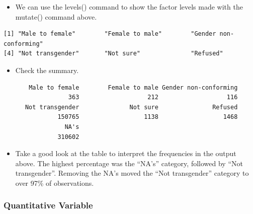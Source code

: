 \documentclass[
  letterpaper,
  DIV=11,
  numbers=noendperiod]{scrreprt}
\newenvironment{Shaded}{\begin{snugshade}}{\end{snugshade}}
\newcommand{\FunctionTok}[1]{\textcolor[rgb]{0.28,0.35,0.67}{#1}}
\newcommand{\NormalTok}[1]{\textcolor[rgb]{0.00,0.23,0.31}{#1}}
\newcommand{\SpecialCharTok}[1]{\textcolor[rgb]{0.37,0.37,0.37}{#1}}
\providecommand{\tightlist}{%
  \setlength{\itemsep}{0pt}\setlength{\parskip}{0pt}}\usepackage{longtable,booktabs,array}
\begin{document}
\begin{itemize}
\tightlist
\item
  We can use the levels() command to show the factor levels made with
  the mutate() command above.
\end{itemize}

\begin{Shaded}
\end{Shaded}

\begin{verbatim}
[1] "Male to female"        "Female to male"        "Gender non-conforming"
[4] "Not transgender"       "Not sure"              "Refused"              
\end{verbatim}

\begin{itemize}
\tightlist
\item
  Check the summary.
\end{itemize}

\begin{Shaded}
\end{Shaded}

\begin{verbatim}
       Male to female        Female to male Gender non-conforming 
                  363                   212                   116 
      Not transgender              Not sure               Refused 
               150765                  1138                  1468 
                 NA's 
               310602 
\end{verbatim}

\begin{itemize}
\tightlist
\item
  Take a good look at the table to interpret the frequencies in the
  output above. The highest percentage was the ``NA's'' category,
  followed by ``Not transgender''. Removing the NA's moved the ``Not
  transgender'' category to over 97\% of observations.
\end{itemize}

\subsubsection{Quantitative Variable}\label{quantitative-variable}
\end{document}
